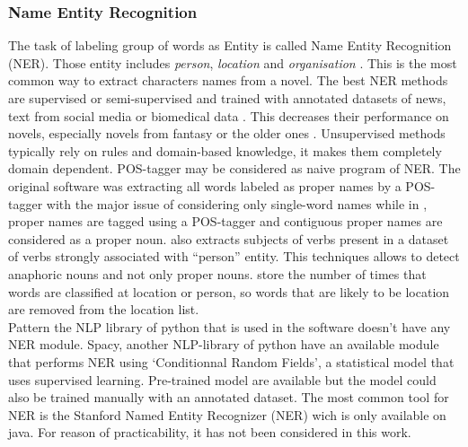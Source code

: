 \documentclass[a4paper, 12pt]{report}
\begin{document}
\subsubsection{Name Entity Recognition}
The task of labeling group of words as Entity is called Name Entity Recognition (NER). Those entity includes \textit{person}, \textit{location} and \textit{organisation} \citep{libraries}. This is the most common way to extract characters names from a novel.
The best NER methods are supervised or semi-supervised and trained with annotated datasets of news, text from social media or biomedical data \citep{NER_survey_recent}. This decreases their performance on novels, especially novels from fantasy or the older ones \citep{NER}.  Unsupervised methods typically rely on rules and domain-based knowledge, it makes them completely domain dependent.  POS-tagger may be considered as naive program of NER. The original software \citep{original} was extracting all words labeled as proper names by a POS-tagger with the major issue of considering only single-word names while in \cite{quoted}, proper names are tagged using a POS-tagger and contiguous proper names are considered as a proper noun. \cite{character_meta} also extracts subjects of verbs present in a dataset of verbs strongly associated with ``person'' entity. This techniques allows to detect anaphoric nouns and not only proper nouns. \cite{ structure_clustering} store the number of times that words are classified at location or person, so words that are likely to be location are removed from the location list. \\
Pattern the NLP  library of python that is used in the software doesn't have any NER module. Spacy, another NLP-library of python have an available module that performs NER using `Conditionnal Random Fields', a statistical model that uses supervised learning. Pre-trained model are available but the model could also be trained manually with an annotated dataset.  The most common tool for NER is the Stanford Named Entity Recognizer (NER) wich is only available on java. For reason of practicability, it has not been considered in this work.
\end{document}

